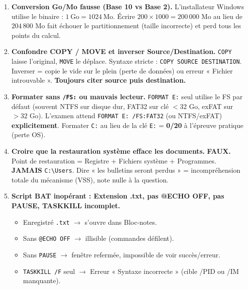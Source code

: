 \documentclass[11pt]{article}
\begin{document}
\begin{attention}
\begin{enumerate}
  \item \textbf{Conversion Go/Mo fausse (Base 10 vs Base 2).} L'installateur Windows utilise le binaire : $1~\text{Go} = 1024~\text{Mo}$. Écrire $200 \times 1000 = 200\,000$ Mo au lieu de $204\,800$ Mo fait échouer le partitionnement (taille incorrecte) et perd tous les points du calcul.
  \item \textbf{Confondre COPY / MOVE et inverser Source/Destination.} \texttt{COPY} laisse l'original, \texttt{MOVE} le déplace. Syntaxe stricte : \texttt{COPY SOURCE DESTINATION}. Inverser = copie le vide sur le plein (perte de données) ou erreur « Fichier introuvable ». \textbf{Toujours citer source puis destination.}
  \item \textbf{Formater sans \texttt{/FS:} ou mauvais lecteur.} \texttt{FORMAT E:} seul utilise le FS par défaut (souvent NTFS sur disque dur, FAT32 sur clé $< 32$ Go, exFAT sur $> 32$ Go). L'examen attend \texttt{FORMAT E: /FS:FAT32} (ou NTFS/exFAT) \textbf{explicitement}. Formater \texttt{C:} au lieu de la clé \texttt{E:} = \textbf{0/20} à l'épreuve pratique (perte OS).
  \item \textbf{Croire que la restauration système efface les documents.} \textbf{FAUX.} Point de restauration = Registre + Fichiers système + Programmes. \textbf{JAMAIS} \texttt{C:\textbackslash Users}. Dire « les bulletins seront perdus » = incompréhension totale du mécanisme (VSS), note nulle à la question.
  \item \textbf{Script BAT inopérant : Extension .txt, pas @ECHO OFF, pas PAUSE, TASKKILL incomplet.}
        \begin{itemize}
          \item Enregistré \texttt{.txt} $\rightarrow$ s'ouvre dans Bloc-notes.
          \item Sans \texttt{@ECHO OFF} $\rightarrow$ illisible (commandes défilent).
          \item Sans \texttt{PAUSE} $\rightarrow$ fenêtre refermée, impossible de voir succès/erreur.
          \item \texttt{TASKKILL /F} seul $\rightarrow$ Erreur « Syntaxe incorrecte » (cible /PID ou /IM manquante).
        \end{itemize}
\end{enumerate}
\end{attention}
\end{document}
